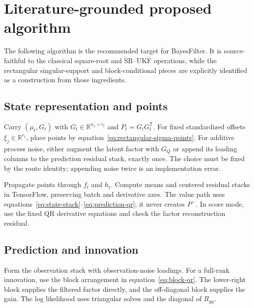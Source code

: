 \documentclass[11pt]{article}
\newcommand{\R}{\mathbb{R}}
\newcommand{\transpose}{^{\mathsf T}}
\begin{document}
\section{Literature-grounded proposed algorithm}
\label{sec:algorithm}

The following algorithm is the recommended target for BayesFilter.  It is
source-faithful to the classical square-root and SR--UKF operations, while the
rectangular singular-support and block-conditional pieces are explicitly
identified as a construction from those ingredients.

\subsection{State representation and points}

Carry $(\mu_t,G_t)$ with $G_t\in\R^{n_x\times r_t}$ and
$P_t=G_tG_t\transpose$.  For fixed standardized offsets $\xi_j\in\R^{r_t}$,
place points by equation~\eqref{eq:rectangular-sigma-points}.  For additive
process noise, either augment the latent factor with $G_Q$ or append its loading
columns to the prediction residual stack, exactly once.  The choice must be
fixed by the route identity; appending noise twice is an implementation error.

Propagate points through $f_t$ and $h_t$.  Compute means and centered residual
stacks in TensorFlow, preserving batch and derivative axes.  The value path uses
equations~\eqref{eq:state-stack}--\eqref{eq:prediction-qr}; it never creates
$P^-$.  In score mode, use the fixed QR derivative equations and check the
factor reconstruction residual.

\subsection{Prediction and innovation}

Form the observation stack with observation-noise loadings.  For a full-rank
innovation, use the block arrangement in equation~\eqref{eq:block-qr}.  The
lower-right block supplies the filtered factor directly, and the off-diagonal
block supplies the gain.  The log likelihood uses triangular solves and the
diagonal of $R_{yy}$.
\end{document}
